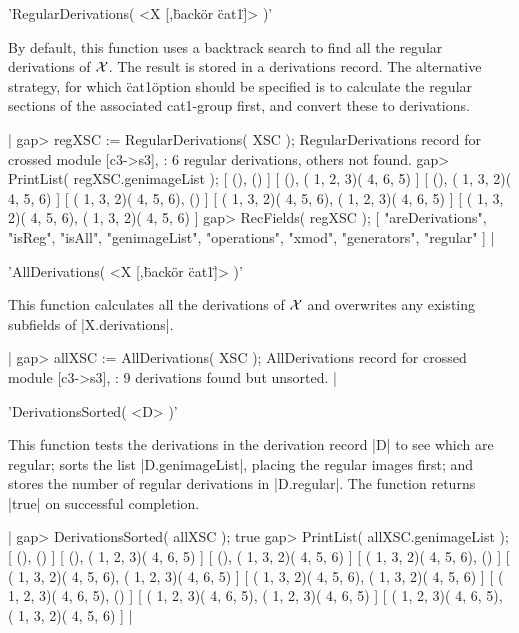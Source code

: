 %

'RegularDerivations( <X [,\"back\" {\rm or} \"cat1\"]> )'

By default,   this function uses  a  backtrack search to  find all the
regular  derivations   of ${\cal X}$.   The  result   is stored  in  a
derivations record.     The alternative strategy,  for  which \"cat1\"
option should be specified is to calculate the regular sections of the
associated cat1-group first, and convert these to derivations.

|    gap> regXSC := RegularDerivations( XSC );
    RegularDerivations record for crossed module [c3->s3],
    : 6 regular derivations, others not found.
    gap> PrintList( regXSC.genimageList );
    [ (), () ]
    [ (), ( 1, 2, 3)( 4, 6, 5) ]
    [ (), ( 1, 3, 2)( 4, 5, 6) ]
    [ ( 1, 3, 2)( 4, 5, 6), () ]
    [ ( 1, 3, 2)( 4, 5, 6), ( 1, 2, 3)( 4, 6, 5) ]
    [ ( 1, 3, 2)( 4, 5, 6), ( 1, 3, 2)( 4, 5, 6) ]
    gap> RecFields( regXSC );
    [ "areDerivations", "isReg", "isAll", "genimageList", "operations",
      "xmod", "generators", "regular" ]  |

%

'AllDerivations( <X [,\"back\" {\rm or} \"cat1\"]> )'

This function  calculates  all  the   derivations  of ${\cal  X}$  and
overwrites any existing subfields of |X.derivations|.

|    gap> allXSC := AllDerivations( XSC );
    AllDerivations record for crossed module [c3->s3],
    : 9 derivations found but unsorted.  |

%

'DerivationsSorted( <D> )'

This function tests  the derivations in  the derivation record |D|  to
see  which are regular; sorts the   list |D.genimageList|, placing the
regular images first; and stores  the number of regular derivations in
|D.regular|.  The function returns |true| on successful completion.

|    gap> DerivationsSorted( allXSC );
    true
    gap> PrintList( allXSC.genimageList );
    [ (), () ]
    [ (), ( 1, 2, 3)( 4, 6, 5) ]
    [ (), ( 1, 3, 2)( 4, 5, 6) ]
    [ ( 1, 3, 2)( 4, 5, 6), () ]
    [ ( 1, 3, 2)( 4, 5, 6), ( 1, 2, 3)( 4, 6, 5) ]
    [ ( 1, 3, 2)( 4, 5, 6), ( 1, 3, 2)( 4, 5, 6) ]
    [ ( 1, 2, 3)( 4, 6, 5), () ]
    [ ( 1, 2, 3)( 4, 6, 5), ( 1, 2, 3)( 4, 6, 5) ]
    [ ( 1, 2, 3)( 4, 6, 5), ( 1, 3, 2)( 4, 5, 6) ]  |

